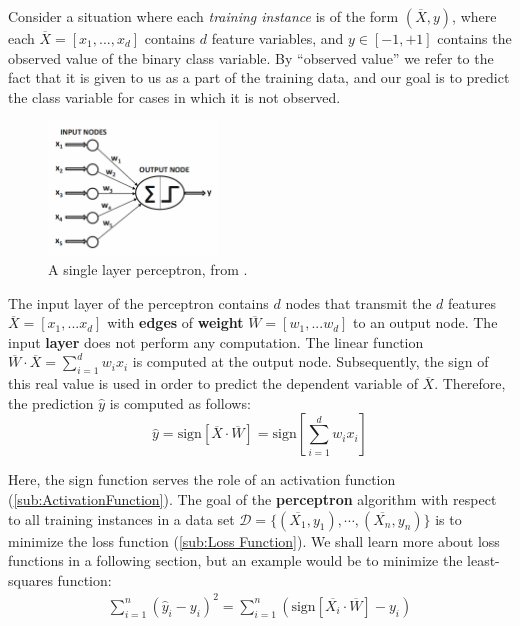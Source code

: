 \documentclass{article}
\begin{document}
Consider a situation where each \textit{training instance} is of the form $(\overline{X}, y)$, where each $\overline{X} = [x_1,..., x_d]$ contains $d$ feature variables, and $y \in [-1, +1]$ contains the observed value of the binary class variable. By “observed value” we refer to the fact that it is given to us as a part of the training data, and our goal is to predict the class variable for cases in which it is not observed.

\begin{figure} %
    \centering
    \includegraphics[width=0.4\textwidth]{SingleLayerP}
    \caption{A single layer perceptron, from \cite{inbook:Aggarwal-1.2}.}
    \label{fig:SLP}
\end{figure}

The input layer of the {perceptron} contains $d$ nodes that transmit the $d$ features $\overline{X} = [x_1, . . . x_d]$ with \textbf{edges} of \textbf{weight} $\overline{W} = [w_1, . . . w_d]$  to an output node. The input \textbf{layer} does not perform any computation. The linear function $\overline{W} \cdot \overline{X} =\sum^{d}_{i=1}  w_ix_i$ is computed at the output node. Subsequently, the sign of this real value is used in order to predict the dependent variable of $\overline{X}$. Therefore, the prediction $\hat y$ is computed as follows:
    $$\hat y = \text{sign}[\overline{X} \cdot \overline{W}] =\text{sign}\left[\sum^{d}_{i=1}  w_ix_i\right] $$

Here, the sign function serves the role of an activation function (\autoref{sub:ActivationFunction}). The goal of the \textbf{perceptron} algorithm with respect to all training instances in a data set $\mathcal{D} = \{(\overline{X_1}, y_1 ), \cdots,(\overline{X_n}, y_n )\}$ is to minimize the loss function (\autoref{sub:Loss Function}). We shall learn more about loss functions in a following section, but an example would be to minimize the least-squares function: 
 \begin{equation*}
  \begin{split}
    \sum^{n}_{i=1} (\hat y_i - y_i)^2 =\sum^{n}_{i=1} \left(\text{sign}[\overline{X_i} \cdot \overline{W}] -y_i \right)
  \end{split}
 \end{equation*}
\end{document}
